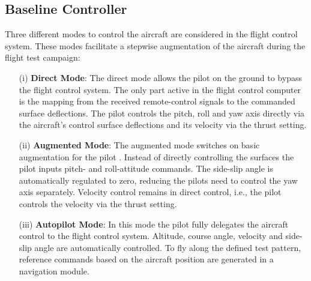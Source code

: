 \documentclass[aerospace,article,submit,moreauthors,pdftex,10pt,a4paper]{Definitions/mdpi}
\begin{document}
\subsection{Baseline Controller}
Three different modes to control the aircraft are considered in the flight control system. These modes facilitate a stepwise augmentation of the aircraft during the flight test campaign:

\begin{itemize}
	\item[(i)] \textbf{Direct Mode}: The direct mode allows the pilot on the ground to bypass the flight control system. The only part active in the flight control computer is the mapping from the received remote-control signals to the commanded surface deflections. The pilot controls the pitch, roll and yaw axis directly via the aircraft's control surface deflections and its velocity via the thrust setting. 
	
	\item[(ii)] \textbf{Augmented Mode}: The augmented mode switches on basic augmentation for the pilot \cite{Weiser2018}. Instead of directly controlling the surfaces the pilot inputs pitch- and roll-attitude commands. The side-slip angle is automatically regulated to zero, reducing the pilots need to control the yaw axis separately. Velocity control remains in direct control, i.e., the pilot controls the velocity via the thrust setting.
	
	\item[(iii)] \textbf{Autopilot Mode}: In this mode the pilot  fully delegates the aircraft control to the flight control system. Altitude, course angle, velocity and side-slip angle are automatically controlled. To fly along the defined test pattern, reference commands based on the aircraft position are generated in a navigation module.
\end{itemize}
\end{document}

